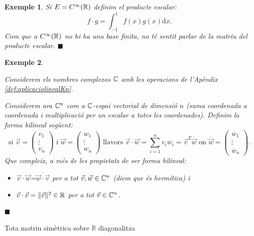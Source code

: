 \documentclass[
  11pt,
]{book}
\makeatletter
\numberwithin{dummy}{section}
\theoremstyle{maincolornumbox}
\theoremstyle{blacknumex}
\newtheorem{exampleT}{Exemple}[chapter]
\theoremstyle{blacknumbox}
\theoremstyle{maincolornum}
\newenvironment{example}{\begin{exampleT}}{\hfill{\tiny\ensuremath{\blacksquare}}\end{exampleT}}
\renewcommand{\section}{\@startsection{section}{1}{\z@}
{-4ex \@plus -1ex \@minus -.4ex}
{1ex \@plus.2ex }
{\normalfont\large\sffamily\bfseries}}
\newlength\esp
\makeatother
\begin{document}
\begin{example}
Si \(E=C^\infty(\mathbb{R})\) definim el producte escalar:
\[f\cdot g = \int_{-1}^1 f(x)g(x)\mathrm{d}x .\] Com que a
\(C^\infty(\mathbb{R})\) no hi ha una base finita, no té sentit parlar de la
matriu del producte escalar.
\end{example}

\begin{example}
\protect\hypertarget{exm:complexos}{}\label{exm:complexos}

Considerem els nombres
complexos \(\mathbb{C}\) amb les operacions de
l'Apèndix \ref{def:aplicaciolinealKn}.

Considerem ara \(\mathbb{C}^n\) com a \(\mathbb{C}\)-espai vectorial de dimensió \(n\) (suma
coordenada a coordenada i multiplicació per un escalar a totes les
coordenades). Definim la forma bilineal següent: \[\text{si }
\vec v=\begin{pmatrix}
v_1 \\ \vdots \\ v_n
\end{pmatrix}
\text{ i }
\vec w=\begin{pmatrix}
w_1 \\ \vdots \\ w_n
\end{pmatrix}
\text{ llavors }
\vec v\cdot \vec w= \sum_{i=1}^n v_i\overline{w}_i=\vec v^T \overline{\vec w} \text{ on }
\overline{\vec w}=\begin{pmatrix}
\overline w_1 \\ \vdots \\ \overline w_n
\end{pmatrix}.\] Que compleix, a més de les propietats de ser forma
bilineal:

\begin{itemize}
\item
  \(\vec v\cdot \vec w\)=\(\overline{\vec w\cdot \vec v}\) per a tot
  \(\vec v,\vec w\in \mathbb{C}^n\) (diem que és hermítica) i
\item
  \(\vec v\cdot \vec v=\|\vec v\|^2\in \mathbb{R}\) per a tot \(\vec v\in\mathbb{C}^n\).
\end{itemize}

\end{example}

\hypertarget{tota-matriu-simuxe8trica-sobre-mathbbr-diagonalitza}{%
\section{\texorpdfstring{Tota matriu simètrica sobre \(\mathbb{R}\) diagonalitza}{Tota matriu simètrica sobre \textbackslash mathbb\{R\} diagonalitza}}\label{tota-matriu-simuxe8trica-sobre-mathbbr-diagonalitza}}
\end{document}
